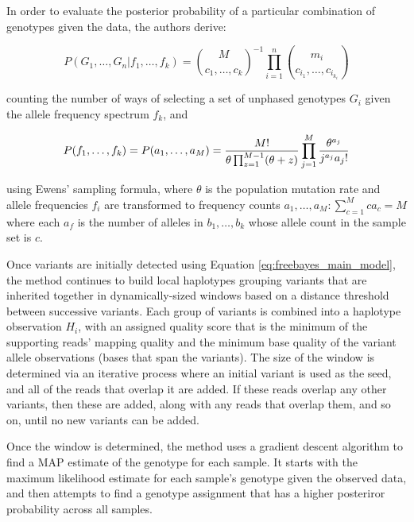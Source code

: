 In order to evaluate the posterior probability of a particular combination of genotypes given the data, the authors derive:

\begin{equation}
\label{eq:freebayes_unphasedsampling}
P(G_1,\ldots,G_n | f_1,\ldots,f_k) =
{ M \choose c_1,\ldots,c_k }^{-1}
\prod_{i=1}^n { m_i \choose c_{i_1}, \ldots, c_{i_{k_i}}}
\end{equation}
    
counting the number of ways of selecting a set of unphased genotypes $G_i$ given the allele frequency spectrum $f_k$, and

\begin{equation}
    \label{eq:freebayes_afs}
P(f_1,\ldots,f_k) =
P(a_1,\ldots,a_M) = 
{M! \over \theta \prod_{z=1}^{M-1}(\theta+z)}
\prod_{j=1}^M{\theta^{a_j} \over j^{a_j} a_j!}
\end{equation}

using Ewens' sampling formula\autocite{ewens1972sampling}, where $\theta$ is the population mutation rate and allele frequencies $f_i$ are transformed to frequency counts $a_1,\ldots,a_M : \sum_{c=1}^M{ca_c} = M$ where each $a_f$ is the number of alleles in $b_1,\ldots,b_k$ whose allele count in the sample set is $c$.

Once variants are initially detected using Equation \ref{eq:freebayes_main_model}, the method continues to build local haplotypes grouping variants that are inherited together in dynamically-sized windows based on a distance threshold between successive variants. Each group of variants is combined into a haplotype observation $H_i$, with an assigned quality score that is the minimum of the supporting reads' mapping quality and the minimum base quality of the variant allele observations (bases that span the variants). The size of the window is determined via an iterative process where an initial variant is used as the seed, and all of the reads that overlap it are added. If these reads overlap any other variants, then these are added, along with any reads that overlap them, and so on, until no new variants can be added.

Once the window is determined, the method uses a gradient descent algorithm to find a MAP estimate of the genotype for each sample. It starts with the maximum likelihood estimate for each sample's genotype given the observed data, and then attempts to find a genotype assignment that has a higher posteriror probability across all samples.

